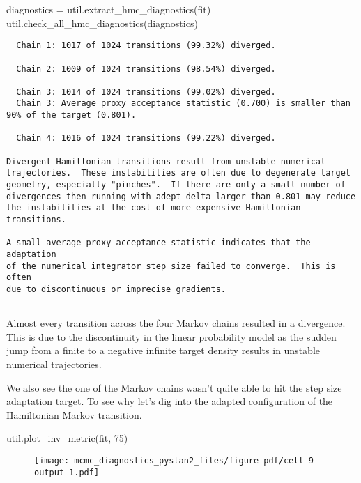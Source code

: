 \documentclass[
  letterpaper,
  DIV=11,
  numbers=noendperiod]{scrartcl}
\newenvironment{Shaded}{\begin{snugshade}}{\end{snugshade}}
\newcommand{\DecValTok}[1]{\textcolor[rgb]{0.68,0.00,0.00}{#1}}
\newcommand{\NormalTok}[1]{\textcolor[rgb]{0.00,0.23,0.31}{#1}}
\newcommand{\OperatorTok}[1]{\textcolor[rgb]{0.37,0.37,0.37}{#1}}
\begin{document}
\begin{Shaded}
\begin{Highlighting}[]
\NormalTok{diagnostics }\OperatorTok{=}\NormalTok{ util.extract\_hmc\_diagnostics(fit)}
\NormalTok{util.check\_all\_hmc\_diagnostics(diagnostics)}
\end{Highlighting}
\end{Shaded}

\begin{verbatim}
  Chain 1: 1017 of 1024 transitions (99.32%) diverged.
 
  Chain 2: 1009 of 1024 transitions (98.54%) diverged.
 
  Chain 3: 1014 of 1024 transitions (99.02%) diverged.
  Chain 3: Average proxy acceptance statistic (0.700) is smaller than
90% of the target (0.801).
 
  Chain 4: 1016 of 1024 transitions (99.22%) diverged.
 
Divergent Hamiltonian transitions result from unstable numerical
trajectories.  These instabilities are often due to degenerate target
geometry, especially "pinches".  If there are only a small number of
divergences then running with adept_delta larger than 0.801 may reduce
the instabilities at the cost of more expensive Hamiltonian transitions.
 
A small average proxy acceptance statistic indicates that the adaptation
of the numerical integrator step size failed to converge.  This is often
due to discontinuous or imprecise gradients.
 
\end{verbatim}

Almost every transition across the four Markov chains resulted in a
divergence. This is due to the discontinuity in the linear probability
model as the sudden jump from a finite to a negative infinite target
density results in unstable numerical trajectories.

We also see the one of the Markov chains wasn't quite able to hit the
step size adaptation target. To see why let's dig into the adapted
configuration of the Hamiltonian Markov transition.

\begin{Shaded}
\begin{Highlighting}[]
\NormalTok{util.plot\_inv\_metric(fit, }\DecValTok{75}\NormalTok{)}
\end{Highlighting}
\end{Shaded}

\begin{figure}[H]

{\centering \texttt{[image: mcmc\_diagnostics\_pystan2\_files/figure-pdf/cell-9-output-1.pdf]}

}

\end{figure}
\end{document}
